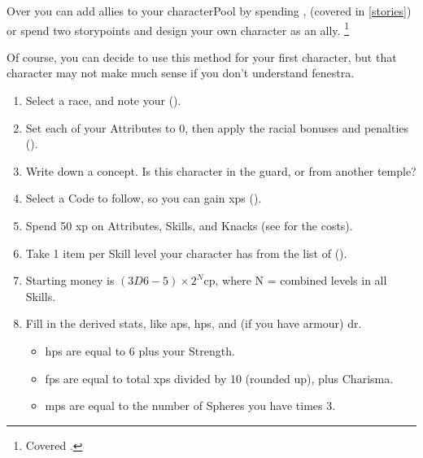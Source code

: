 \begin{multicols}{2}

\label{playerchosen}

\noindent
Over  you can add allies to your \gls{characterPool} by spending ,
(covered in \autoref{stories})
or spend two \glspl{storypoint} and design your own character as an ally.%
\footnote{Covered .}

Of course, you can decide to use this method for your first character, but that character may not make much sense if you don't understand \gls{fenestra}.

\begin{enumerate}
  \item\label{sumCCrace}
  Select a race, and note your  ().
  \item\label{sumCCatt}
  Set each of your Attributes to 0, then apply the racial bonuses and penalties ().
  \item\label{sumCCconcept}
  Write down a concept.
  Is this character in the \gls{guard}, or from another temple?
  \item\label{sumCCcode}
  Select a Code to follow, so you can gain \glspl{xp} ().
  \item\label{sumCCxp}
  Spend 50 \gls{xp} on Attributes, Skills, and Knacks (see  for the costs).
  \item\label{sumCCequip}
  Take 1 item per Skill level your character has from the list of  ().
  \item\label{sumCCcoin}
  Starting money is $(3D6-5)\times 2^N$\gls{cp}, where N = combined levels in all Skills.
  \item\label{sumCCder}
  Fill in the derived stats, like \glspl{ap}, \glspl{hp}, and (if you have armour) \gls{dr}.
  \begin{itemize}
    \item
    \glspl{hp} are equal to 6 plus your Strength.
    \item
    \glspl{fp} are equal to total \glspl{xp} divided by 10 (rounded up), plus Charisma.
    \item
    \glspl{mp} are equal to the number of Spheres you have times 3.
  \end{itemize}
\end{enumerate}

\columnbreak


\end{multicols}
